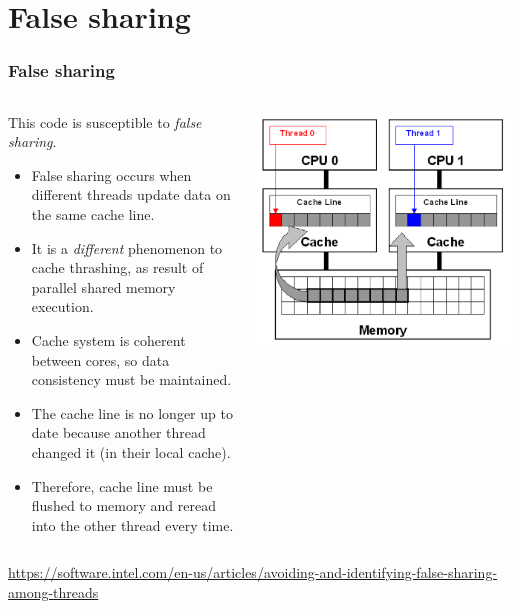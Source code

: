 \documentclass{beamer}
\begin{document}
\section{False sharing}
\begin{frame}
\frametitle{False sharing}
\begin{columns}
\begin{column}{.65\textwidth}
This code is susceptible to \emph{false sharing}.
\begin{itemize}
  \item False sharing occurs when different threads update data on the same cache line.
  \item It is a \emph{different} phenomenon to cache thrashing, as result of parallel shared memory execution.
  \item Cache system is coherent between cores, so data consistency must be maintained.
  \item The cache line is no longer up to date because another thread changed it (in their local cache).
  \item Therefore, cache line must be flushed to memory and reread into the other thread every time.
\end{itemize}
\end{column}
\begin{column}{.35\textwidth}
\begin{center}
\includegraphics[width=\textwidth]{intel_false_sharing.png}
\end{center}
\end{column}
\end{columns}
{\Tiny \url{https://software.intel.com/en-us/articles/avoiding-and-identifying-false-sharing-among-threads}}
\end{frame}
\end{document}
